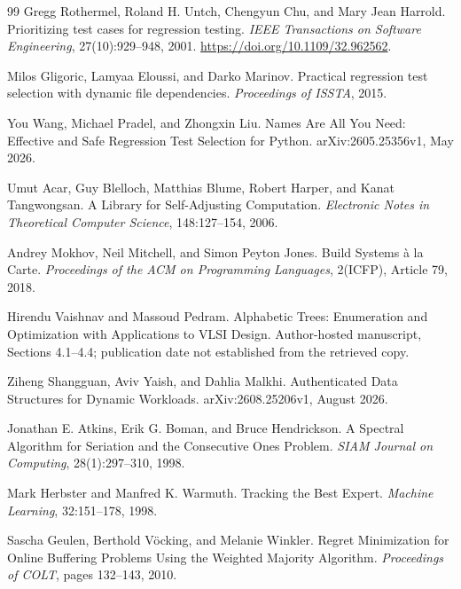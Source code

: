 \begin{thebibliography}{99}
 Gregg Rothermel, Roland H. Untch, Chengyun Chu, and Mary Jean Harrold.
\newblock Prioritizing test cases for regression testing.
\newblock \emph{IEEE Transactions on Software Engineering}, 27(10):929--948, 2001.
\newblock \url{https://doi.org/10.1109/32.962562}.

 Milos Gligoric, Lamyaa Eloussi, and Darko Marinov.
\newblock Practical regression test selection with dynamic file dependencies.
\newblock \emph{Proceedings of ISSTA}, 2015.

 You Wang, Michael Pradel, and Zhongxin Liu.
\newblock Names Are All You Need: Effective and Safe Regression Test Selection for Python.
\newblock arXiv:2605.25356v1, May 2026.

 Umut Acar, Guy Blelloch, Matthias Blume, Robert Harper, and Kanat Tangwongsan.
\newblock A Library for Self-Adjusting Computation.
\newblock \emph{Electronic Notes in Theoretical Computer Science}, 148:127--154, 2006.

 Andrey Mokhov, Neil Mitchell, and Simon Peyton Jones.
\newblock Build Systems \`a la Carte.
\newblock \emph{Proceedings of the ACM on Programming Languages}, 2(ICFP), Article 79, 2018.

 Hirendu Vaishnav and Massoud Pedram.
\newblock Alphabetic Trees: Enumeration and Optimization with Applications to VLSI Design.
\newblock Author-hosted manuscript, Sections 4.1--4.4; publication date not established from the retrieved copy.

 Ziheng Shangguan, Aviv Yaish, and Dahlia Malkhi.
\newblock Authenticated Data Structures for Dynamic Workloads.
\newblock arXiv:2608.25206v1, August 2026.

 Jonathan E. Atkins, Erik G. Boman, and Bruce Hendrickson.
\newblock A Spectral Algorithm for Seriation and the Consecutive Ones Problem.
\newblock \emph{SIAM Journal on Computing}, 28(1):297--310, 1998.

 Mark Herbster and Manfred K. Warmuth.
\newblock Tracking the Best Expert.
\newblock \emph{Machine Learning}, 32:151--178, 1998.

 Sascha Geulen, Berthold V\"ocking, and Melanie Winkler.
\newblock Regret Minimization for Online Buffering Problems Using the Weighted Majority Algorithm.
\newblock \emph{Proceedings of COLT}, pages 132--143, 2010.


\end{thebibliography}
